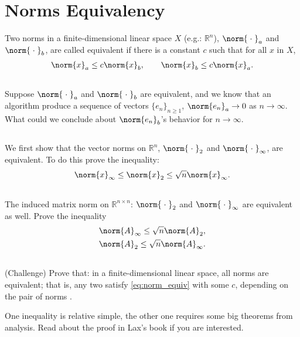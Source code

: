 \documentclass[11pt,letterpaper]{article}
\begin{document}
\newpage
\section{Norms Equivalency}
Two norms in a finite-dimensional linear space $X$ (e.g.: $\mathbb{R}^n$), $\norm{\;\cdot\;}_a$ and $\norm{\;\cdot\;}_b$, are called equivalent if there is a constant $c$ such that for all $x$ in $X$,
\begin{align}
    \norm{x}_a\leq c\norm{x}_b,\qquad \norm{x}_b\leq c\norm{x}_a.\label{eq:norm_equiv}
\end{align}

\subsection{}
Suppose $\norm{\;\cdot\;}_a$ and $\norm{\;\cdot\;}_b$ are equivalent, and we know that an algorithm produce a sequence of vectors $\{e_n\}_{n\geq 1}$, $\norm{e_n}_a\to 0$ as $n\to\infty$. What could we conclude about $\norm{e_n}_b$'s behavior for $n\to\infty$.

\subsection{}
We first show that the vector norms on $\mathbb{R}^n$, $\norm{\;\cdot\;}_{2}$ and $\norm{\;\cdot\;}_{\infty}$, are equivalent. To do this prove the inequality:
\begin{align*}
    \norm{x}_\infty \leq \norm{x}_2 \leq \sqrt{n}\norm{x}_\infty.
\end{align*}

\subsection{}
The induced matrix norm on $\mathbb{R}^{n\times n}$: $\norm{\;\cdot\;}_{2}$ and $\norm{\;\cdot\;}_{\infty}$ are equivalent as well. Prove the inequality
\begin{align*}
    &\norm{A}_\infty \leq \sqrt{n}\norm{A}_2,\\
    &\norm{A}_2 \leq \sqrt{n}\norm{A}_\infty.
\end{align*}

\subsection{}
(Challenge) Prove that: in a finite-dimensional linear space, all norms are equivalent; that is, any two satisfy \eqref{eq:norm_equiv} with some $c$, depending on the pair of norms \cite[p.217]{Lax_07}.

One inequality is relative simple, the other one requires some big theorems from analysis. Read about the proof in Lax's book if you are interested.


\vfill


\end{document}
